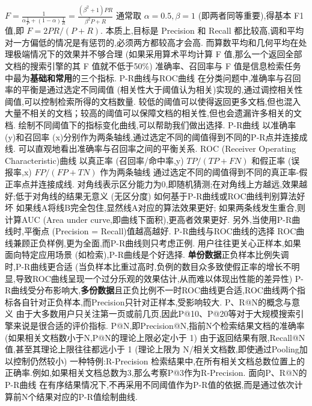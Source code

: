 \documentclass[10pt, utf8]{ctexart}
\begin{document}
\begin{multicols}{4}
    $F=\frac{1}{\alpha\frac{1}{P} + (1-\alpha)\frac{1}{R}} = \frac{(\beta ^2+1)PR}{\beta ^2P+R} $
    通常取 $\alpha=0.5,\beta=1$ (即两者同等重要),得基本 F1 值,即 $F=2PR/(P+R)$.
    本质上,目标是 Precision 和 Recall 都比较高,调和平均对一方偏低的情况是有惩罚的,必须两方都较高才会高.
    而算数平均和几何平均在处理极端情况下的效果并不够合理 (如果采用算术平均计算 F 值,那么一个返回全部文档的搜索引擎的其 F 值就不低于50\%)
    准确率、召回率与 F 值是信息检索任务中最为\textbf{基础和常用}的三个指标.
    {\color{blue}P-R曲线与ROC曲线}
    在分类问题中,准确率与召回率的平衡是通过选定不同阈值 (相关性大于阈值认为相关)实现的,通过调控相关性阈值,可以控制检索所得的文档数量.
    较低的阈值可以使得返回更多文档,但也混入大量不相关的文档；较高的阈值可以保障文档的相关性,但也会遗漏许多相关的文档.
    绘制不同阈值下的指标变化曲线,可以帮助我们做出选择.
    {\color{blue}P-R曲线}
    以准确率 (y)和召回率 (x)分别作为两条轴线,通过选定不同的阈值得到不同的P-R点并连接成线.
    可以直观地看出准确率与召回率之间的平衡关系.
    {\color{blue}ROC (Receiver Operating Characteristic)曲线}
    以真正率 (召回率/命中率,y) $TP/(TP+FN)$ 和假正率 (误报率,x) $FP/(FP+TN)$ 作为两条轴线
    通过选定不同的阈值得到不同的真正率-假正率点并连接成线.
    对角线表示区分能力为0,即随机猜测;在对角线上方越远,效果越好;低于对角线的结果无意义 (无区分度)
    {\color{blue}如何基于P-R曲线或ROC曲线判别算法好坏}
    如果线A将线B完全包住,显然线A对应的算法效果更好;
    如果两条线发生重合,则计算AUC (Area under curve,即曲线下面积),更高者效果更好.
    另外,当使用P-R曲线时,平衡点 (Precision = Recall)值越高越好.
    {\color{blue}P-R曲线与ROC曲线的选择}
    ROC曲线兼顾正负样例,更为全面,而P-R曲线则只考虑正例.
    用户往往更关心正样本,如果面向特定应用场景 (如检索),P-R曲线是个好选择.
    \textbf{单份数据}正负样本比例失调时,P-R曲线更合适 (当负样本比重过高时,负例的数目众多致使假正率的增长不明显,导致ROC曲线呈现一个过分乐观的效果估计,从而难以体现出性能的差异性)
    P-R曲线受分布影响大,\textbf{多份数据}且正负比例不一时ROC曲线更合适,ROC曲线两个指标各自针对正负样本,而Precision只针对正样本,受影响较大.
    {\color{red}P、R@N的概念与意义}
    由于大多数用户只关注第一页或前几页,因此P@10、P@20等对于大规模搜索引擎来说是很合适的评价指标.
    P@N,即Precision@N,指前N个检索结果文档的准确率 (如果相关文档数小于N,P@N的理论上限必定小于 1)
    由于返回结果有限,Recall@N值,甚至其理论上限往往都远小于 1 (理论上限为 N/相关文档数,即使通过Pooling加以控制仍然较小)
    {\color{blue}一种特例:R-Precision}
    检索结果中,在所有相关文档总数位置上的正确率.例如,如果相关文档总数为3,那么考察P@3作为R-Precision.
    {\color{blue}面向P、R@N的P-R曲线}
    在有序结果情况下,不再采用不同阈值作为P-R值的依据,而是通过依次计算前N个结果对应的P-R值绘制曲线.

\end{multicols}
\end{document}

